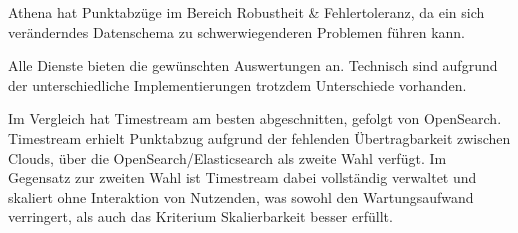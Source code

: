 Athena hat Punktabzüge im Bereich Robustheit \& Fehlertoleranz, da ein sich veränderndes Datenschema zu schwerwiegenderen Problemen führen kann.

Alle Dienste bieten die gewünschten Auswertungen an. Technisch sind aufgrund der unterschiedliche Implementierungen trotzdem Unterschiede vorhanden. 

Im Vergleich hat Timestream am besten abgeschnitten, gefolgt von OpenSearch. Timestream erhielt Punktabzug aufgrund der fehlenden Übertragbarkeit zwischen Clouds, über die OpenSearch/Elasticsearch als zweite Wahl verfügt. Im Gegensatz zur zweiten Wahl ist Timestream dabei vollständig verwaltet und skaliert ohne Interaktion von Nutzenden, was sowohl den Wartungsaufwand verringert, als auch das Kriterium Skalierbarkeit besser erfüllt. 






